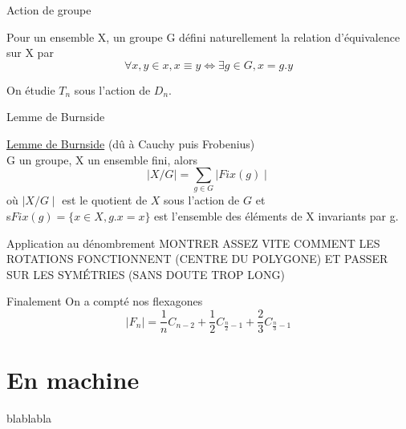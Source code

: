 \documentclass[french,xcolor=dvipsnames]{beamer}
\begin{document}
		\begin{frame}{Action de groupe}
			\begin{definition}
			Pour un ensemble X, un groupe G défini naturellement la relation d'équivalence sur X par
			\[
				\forall x,y \in x, x \equiv y \Leftrightarrow \exists g \in G, x=g.y
			\]
			\end{definition}
			
			On étudie $T_{n}$ sous l'action de $D_{n}$.
		\end{frame}
		\begin{frame}{Lemme de Burnside}
			\begin{theorem}{\underline{Lemme de Burnside} \small{(dû à Cauchy puis Frobenius)}\\}
				G un groupe, X un ensemble fini, alors
				\[
				\mid X/G \mid = \sum_{g\in G}{\mid Fix(g) \mid}
				\]
				où $\mid X/G \mid$ est le quotient de $X$ sous l'action de $G$ et \\s$Fix(g) = \{x\in X, g.x = x\}$ est l'ensemble des éléments de X invariants par g.
			\end{theorem}
		\end{frame}
		
		\begin{frame}{Application au dénombrement}
			MONTRER ASSEZ VITE COMMENT LES ROTATIONS FONCTIONNENT (CENTRE DU POLYGONE) ET PASSER SUR LES SYMÉTRIES (SANS DOUTE TROP LONG)
		\end{frame}
		
		\begin{frame}{Finalement}
		On a compté nos flexagones
		{\Large
		\[
			\mid F_{n} \mid = \frac{1}{n}C_{n-2} + \frac{1}{2}C_{\frac{n}{2}-1} + \frac{2}{3}C_{\frac{n}{3}-1}
		\]
		}
		\end{frame}		
		
		
	\section{En machine}
	blablabla
\end{document}
